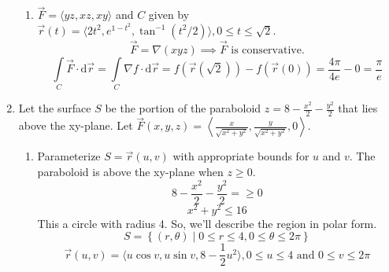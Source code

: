 \begin{enumerate}
\begin{enumerate}[label=\alph*.]
		\item $\vec{F} = \langle yz, xz, xy \rangle$ and $C$ given by $\vec{r}(t) = \langle 2t^2, e^{1-t^2}, \tan^{-1}{(t^2/2)} \rangle, 0 \leq t \leq \sqrt{2}$.
		\begin{equation*}
			\vec{F} = \nabla(xyz) \implies\vec{F} \text{ is conservative.}
		\end{equation*}
		\begin{equation*}
			\int\limits_{C}{\vec{F} \cdot \mathrm{d}\vec{r}} = \int\limits_{C}{\nabla f \cdot \mathrm{d}\vec{r}} = f(\vec{r}(\sqrt{2})) - f(\vec{r}(0)) = \frac{4\pi}{4e} - 0 = \frac{\pi}{e}
		\end{equation*}
	\end{enumerate}
	
	\item Let the surface $S$ be the portion of the paraboloid $z = 8 - \frac{x^2}{2} - \frac{y^2}{2}$ that lies above the xy-plane. Let $\vec{F}(x,y,z) = \left< \frac{x}{\sqrt{x^2 + y^2}}, \frac{y}{\sqrt{x^2 + y^2}}, 0 \right>$.
	\begin{enumerate}[label=\alph*.]
		\item Parameterize $S = \vec{r}(u,v)$ with appropriate bounds for $u$ and $v$.
		The paraboloid is above the xy-plane when $z \geq 0$.
		\begin{equation*}
			8 - \frac{x^2}{2} - \frac{y^2}{2} = \geq 0	
		\end{equation*}
		\begin{equation*}
			x^2 + y^2 \leq 16	
		\end{equation*}
		This a circle with radius 4. So, we'll describe the region in polar form.\\
		\begin{equation*}
			S = \left\{ (r,\theta) \mid 0 \leq r \leq 4, 0 \leq \theta \leq 2\pi \right\}	
		\end{equation*}
		\begin{equation*}
			\vec{r}(u,v) = \langle u\cos{v}, u\sin{v}, 8 - \frac{1}{2}u^2 \rangle, 0 \leq u \leq 4  \text{ and } 0 \leq v \leq 2\pi	
		\end{equation*}
		

\end{enumerate}
\end{enumerate}
